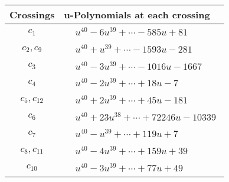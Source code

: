 \documentclass[1p]{elsarticle_modified}
\theoremstyle{definition}
\begin{document}
\begin{tabular}{m{50pt}|m{274pt}}
Crossings & \hspace{64pt}u-Polynomials at each crossing \\
\hline $$\begin{aligned}c_{1}\end{aligned}$$&$\begin{aligned}
&u^{40}-6 u^{39}+\cdots-585 u+81
\end{aligned}$\\
\hline $$\begin{aligned}c_{2},c_{9}\end{aligned}$$&$\begin{aligned}
&u^{40}+u^{39}+\cdots-1593 u-281
\end{aligned}$\\
\hline $$\begin{aligned}c_{3}\end{aligned}$$&$\begin{aligned}
&u^{40}-3 u^{39}+\cdots-1016 u-1667
\end{aligned}$\\
\hline $$\begin{aligned}c_{4}\end{aligned}$$&$\begin{aligned}
&u^{40}-2 u^{39}+\cdots+18 u-7
\end{aligned}$\\
\hline $$\begin{aligned}c_{5},c_{12}\end{aligned}$$&$\begin{aligned}
&u^{40}+2 u^{39}+\cdots+45 u-181
\end{aligned}$\\
\hline $$\begin{aligned}c_{6}\end{aligned}$$&$\begin{aligned}
&u^{40}+23 u^{38}+\cdots+72246 u-10339
\end{aligned}$\\
\hline $$\begin{aligned}c_{7}\end{aligned}$$&$\begin{aligned}
&u^{40}- u^{39}+\cdots+119 u+7
\end{aligned}$\\
\hline $$\begin{aligned}c_{8},c_{11}\end{aligned}$$&$\begin{aligned}
&u^{40}-4 u^{39}+\cdots+159 u+39
\end{aligned}$\\
\hline $$\begin{aligned}c_{10}\end{aligned}$$&$\begin{aligned}
&u^{40}-3 u^{39}+\cdots+77 u+49
\end{aligned}$\\
\hline
\end{tabular}\\~\\
\end{document}
